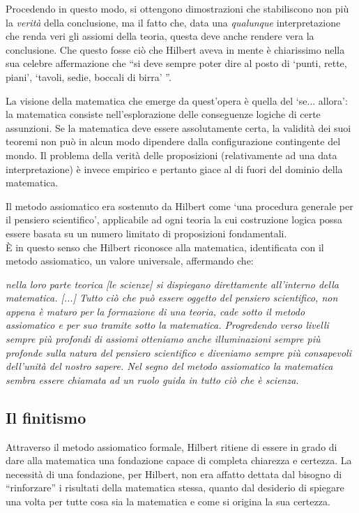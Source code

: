 Procedendo in questo modo, si ottengono dimostrazioni che stabiliscono non più la \emph{verità} della conclusione, ma il fatto che, data una \emph{qualunque} interpretazione che renda veri gli assiomi della teoria, questa deve anche rendere vera la conclusione. Che questo fosse ciò che Hilbert aveva in mente è chiarissimo nella sua celebre affermazione che ``si deve sempre poter dire al posto di `punti, rette, piani', `tavoli, sedie, boccali di birra' ''.

La visione della matematica che emerge da quest'opera è quella del `se... allora': la matematica consiste nell'esplorazione delle conseguenze logiche di certe assunzioni. Se la matematica deve essere assolutamente certa, la validità dei suoi teoremi non può in alcun modo dipendere dalla configurazione contingente del mondo. Il problema della verità delle proposizioni (relativamente ad una data interpretazione) è invece empirico e pertanto giace al di fuori del dominio della matematica.
\bigskip

Il metodo assiomatico era sostenuto da Hilbert come `una procedura ge\-ne\-ra\-le per il pensiero scientifico', applicabile ad ogni teoria la cui costruzione logica possa essere basata su un numero limitato di proposizioni fondamentali.\\
\`{E} in questo senso che Hilbert riconosce alla matematica, identificata con il metodo assiomatico, un valore universale, affermando che:

\emph{nella loro parte teorica [le scienze] si dispiegano direttamente all'interno della matematica. [...] Tutto ciò che può essere oggetto del pensiero scientifico, non appena è maturo per la formazione di una teoria, cade sotto il metodo assiomatico e per suo tramite sotto la matematica. Progredendo verso livelli sempre più profondi di assiomi otteniamo anche illuminazioni sempre più profonde sulla natura del pensiero scientifico e diveniamo sempre più consapevoli dell'unità del nostro sapere. Nel segno del metodo assiomatico la matematica sembra essere chiamata ad un ruolo guida in tutto ciò che è scienza.}
\bigskip

\subsection{Il finitismo}

Attraverso il metodo assiomatico formale, Hilbert ritiene di essere in grado di dare alla matematica una fondazione capace di completa chiarezza e certezza.  La necessità di una fondazione, per Hilbert, non era affatto dettata dal bisogno di ``rinforzare'' i risultati della matematica stessa, quanto dal desiderio di spiegare una volta per tutte cosa sia la matematica e come si origina la sua certezza.

